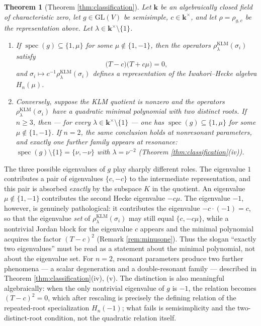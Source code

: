 \documentclass[11pt]{article}
\newtheorem{theorem}{Theorem}[section]
\theoremstyle{definition}
\theoremstyle{remark}
\newcommand{\GL}{\mathrm{GL}}
\newcommand{\spec}{\operatorname{spec}}
\newcommand{\kk}{\boldsymbol{k}}
\newcommand{\rKLM}{\rho^{\mathrm{KLM}}_{\lambda}}
\begin{document}
\begin{theorem}[Theorem \ref{thm:classification}]\label{thm:B}
Let $\kk$ be an algebraically closed field of characteristic zero, let
$g \in \GL(V)$ be semisimple, $c \in \kk^{\times}$, and let $\rho = \rho_{g,c}$
be the representation above. Let $\lambda \in \kk^{\times} \setminus \{1\}$.
\begin{enumerate}
\item[(i)] If $\spec(g) \subseteq \{1, \mu\}$ for some
$\mu \notin \{1, -1\}$, then the operators $\rKLM(\sigma_i)$ satisfy
\[
\bigl(T - c\bigr)\bigl(T + c\mu\bigr) = 0,
\]
and $\sigma_i \mapsto c^{-1}\rKLM(\sigma_i)$ defines a representation of
the Iwahori--Hecke algebra $H_n(\mu)$.
\item[(ii)] Conversely, suppose the KLM quotient is nonzero and the
operators $\rKLM(\sigma_i)$ have a quadratic minimal polynomial with
two distinct roots. If $n \geq 3$, then --- for every
$\lambda \in \kk^{\times}\setminus\{1\}$ --- one has
$\spec(g) \subseteq \{1, \mu\}$ for some $\mu \notin \{1, -1\}$. If
$n = 2$, the same conclusion holds at nonresonant parameters, and
exactly one further family appears at resonance:
$\spec(g) \setminus \{1\} = \{\nu, -\nu\}$ with $\lambda = \nu^{-2}$
(Theorem \ref{thm:classification}(iv)).
\end{enumerate}
\end{theorem}

The three possible eigenvalues of $g$ play sharply different roles. The
eigenvalue $1$ contributes a pair of eigenvalues $\{c, -c\}$ to the
intermediate representation, and this pair is absorbed \emph{exactly} by the
subspace $K$ in the quotient. An eigenvalue $\mu \notin \{1,-1\}$
contributes the second Hecke eigenvalue $-c\mu$. The eigenvalue $-1$,
however, is genuinely pathological: it contributes the eigenvalue
$-c \cdot (-1) = c$, so that the eigenvalue \emph{set} of
$\rKLM(\sigma_i)$ may still equal $\{c, -c\mu\}$, while a nontrivial Jordan
block for the eigenvalue $c$ appears and the minimal polynomial acquires the
factor $(T - c)^2$ (Remark \ref{rem:minusone}). Thus the slogan ``exactly
two eigenvalues'' must be read as a statement about the minimal polynomial,
not about the eigenvalue set. For $n = 2$, resonant parameters produce
two further phenomena --- a scalar degeneration and a double-resonant
family --- described in Theorem \ref{thm:classification}(iv), (v). The distinction is also meaningful
algebraically: when the only nontrivial eigenvalue of $g$ is $-1$, the
relation becomes $(T - c)^2 = 0$, which after rescaling is precisely the
defining relation of the repeated-root specialization $H_n(-1)$; what
fails is semisimplicity and the two-distinct-root condition, not the
quadratic relation itself.
\end{document}
